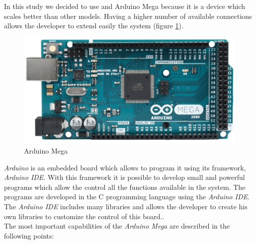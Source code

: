 In this study we decided to use and Arduino Mega because it is a device which scales better than other models. Having a higher number of available connections allows the developer to extend easily the system (figure \ref{Arduino_Mega}).\\

\begin{figure}[H]
\begin{centering}
\includegraphics[scale=0.08]{IMGS/ARDUINO_MEGA.png}
\caption{Arduino Mega \label{Arduino_Mega}}
\end{centering}
\end{figure}

\textit{Arduino} is an embedded board which allows to program it using its framework, \textit{Arduino IDE}. With this framework it is possible to develop small and powerful programs which allow the control all the functions available in the system. The programs are developed in the C programming language using the \textit{Arduino IDE}. The \textit{Arduino IDE} includes many libraries and allows the developer to create his own libraries to customize the control of this board..\\

The most important capabilities of the \textit{Arduino Mega} are described in the following points:

